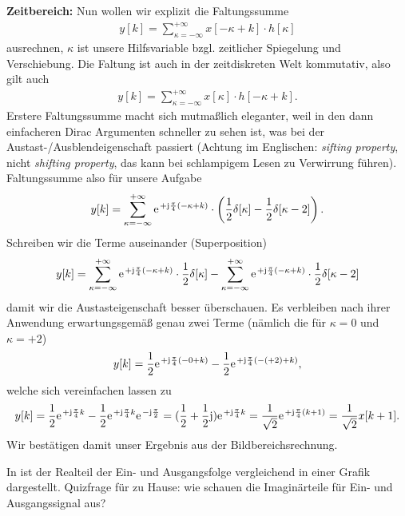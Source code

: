 \begin{ExCalc}
\textbf{Zeitbereich:}
Nun wollen wir explizit die Faltungssumme
\begin{align}
y[k] = \sum_{\kappa=-\infty}^{+\infty} x[-\kappa + k] \cdot h[\kappa]
\end{align}
ausrechnen, $\kappa$ ist unsere Hilfsvariable bzgl. zeitlicher Spiegelung und
Verschiebung.
%
Die Faltung ist auch in der zeitdiskreten Welt kommutativ, also gilt auch
\begin{align}
y[k] = \sum_{\kappa=-\infty}^{+\infty} x[\kappa] \cdot h[-\kappa + k].
\end{align}
%
Erstere Faltungssumme macht sich mutmaßlich eleganter, weil in den dann einfacheren
Dirac Argumenten schneller zu sehen ist, was bei der Austast-/Ausblendeigenschaft passiert
(Achtung im Englischen:
\textit{sifting property}, nicht \textit{shifting property}, das kann bei schlampigem
Lesen zu Verwirrung führen).
%
Faltungssumme also für unsere Aufgabe
%
\begin{align}
y[k] = \sum_{\kappa=-\infty}^{+\infty} \e^{+\im\frac{\pi}{4} (-\kappa+k)} \cdot
\left(\frac{1}{2}\delta[\kappa] - \frac{1}{2}\delta[\kappa-2]\right).
\end{align}
%
Schreiben wir die Terme auseinander (Superposition)
\begin{align}
y[k] =
\sum_{\kappa=-\infty}^{+\infty} \e^{+\im\frac{\pi}{4} (-\kappa+k)} \cdot \frac{1}{2}\delta[\kappa]
-
\sum_{\kappa=-\infty}^{+\infty} \e^{+\im\frac{\pi}{4} (-\kappa+k)} \cdot \frac{1}{2}\delta[\kappa-2]
\end{align}
damit wir die Austasteigenschaft besser überschauen.
%
Es verbleiben nach ihrer Anwendung erwartungsgemäß genau zwei Terme (nämlich die für
$\kappa=0$ und $\kappa=+2$)
\begin{align}
y[k] =
\frac{1}{2} \e^{+\im\frac{\pi}{4} (-0+k)}
-
\frac{1}{2} \e^{+\im\frac{\pi}{4} (-(+2)+k)},
\end{align}
welche sich vereinfachen lassen zu
\begin{align}
y[k] =
\frac{1}{2} \e^{+\im\frac{\pi}{4} k}
-
\frac{1}{2} \e^{+\im\frac{\pi}{4} k} \e^{-\im\frac{\pi}{2}} =
(\frac{1}{2} + \frac{1}{2} \im )\e^{+\im\frac{\pi}{4} k}
=
\frac{1}{\sqrt{2}} \e^{+\im \frac{\pi}{4} (k+1)}=
\frac{1}{\sqrt{2}} x[k+1].
\end{align}
Wir bestätigen damit unser Ergebnis aus der Bildbereichsrechnung.

In  ist der Realteil der Ein- und Ausgangsfolge vergleichend
in einer Grafik dargestellt. Quizfrage für zu Hause: wie schauen die Imaginärteile
für Ein- und Ausgangssignal aus?
\end{ExCalc}
